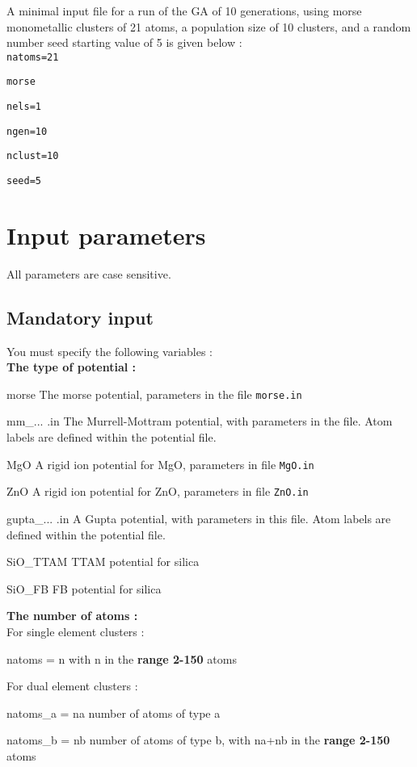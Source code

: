 \documentclass[12pt,a4paper]{article}
\newenvironment{entry}[1]
{\begin{list}{}{\renewcommand{\makelabel}[1]{~~\texttt{##1 :}\hfil}
      \setlength{\labelwidth}{90pt}
      \setlength{\leftmargin}{\labelwidth+\labelsep}}}
{\end{list}}
\begin{document}
\noindent A minimal input file for a run of the GA of 10 generations, using morse monometallic clusters of 21 atoms, a population size of 10 clusters, and a random number seed starting value of 5 is given below : ~\\ [1ex]

\texttt{natoms=21}

\texttt{morse}

\texttt{nels=1}

\texttt{ngen=10}

\texttt{nclust=10}

\texttt{seed=5} 

\section{Input parameters}

All parameters are case sensitive.

\subsection{Mandatory input}

You must specify the following variables : \\

\noindent \textbf{The type of potential :}
\begin{entry}{a}
\item[morse]
The morse potential, parameters in the file \texttt{morse.in}
\item[mm\_... .in]
The Murrell-Mottram potential, with parameters in the file. Atom labels are defined within the potential file.
\item[MgO] 
A rigid ion potential for MgO, parameters in file \texttt{MgO.in}
\item[ZnO] 
A rigid ion potential for ZnO, parameters in file \texttt{ZnO.in}
\item[gupta\_... .in]
A Gupta potential, with parameters in this file.  Atom labels are defined within the potential file.
\item[SiO\_TTAM]
TTAM potential for silica
\item[SiO\_FB]
FB potential for silica
\end{entry}

\noindent \textbf{The number of atoms :} ~\\ [1ex]
\noindent For single element clusters : 
\begin{entry}{b}
\item[natoms = n] with n in the \textbf{range 2-150} atoms
\end{entry}
For dual element clusters :
\begin{entry}{c}
\item[natoms\_a = na] number of atoms of type a
\item[natoms\_b = nb] number of atoms of type b, with na+nb in the \textbf{range 2-150} atoms
\end{entry}
\end{document}
